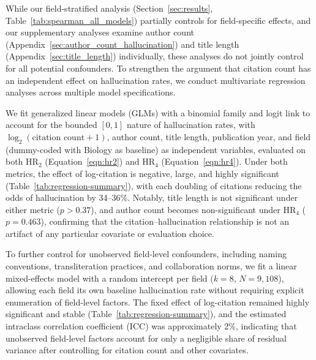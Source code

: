 \documentclass[11pt]{article}
\begin{document}
While our field-stratified analysis (Section~\ref{sec:results}, Table~\ref{tab:spearman_all_models}) partially controls for field-specific effects, and our supplementary analyses examine author count (Appendix~\ref{sec:author_count_hallucination}) and title length (Appendix~\ref{sec:title_length}) individually, these analyses do not jointly control for all potential confounders. To strengthen the argument that citation count has an independent effect on hallucination rates, we conduct multivariate regression analyses across multiple model specifications.

We fit generalized linear models (GLMs) with a binomial family and logit link to account for the bounded $[0,1]$ nature of hallucination rates, with $\log_2(\text{citation count} + 1)$, author count, title length, publication year, and field (dummy-coded with Biology as baseline) as independent variables, evaluated on both HR$_2$ (Equation~\ref{eqn:hr2}) and HR$_4$ (Equation~\ref{eqn:hr4}). Under both metrics, the effect of log-citation is negative, large, and highly significant (Table~\ref{tab:regression-summary}), with each doubling of citations reducing the odds of hallucination by 34--36\%. Notably, title length is not significant under either metric ($p > 0.37$), and author count becomes non-significant under HR$_4$ ($p = 0.463$), confirming that the citation--hallucination relationship is not an artifact of any particular covariate or evaluation choice.

To further control for unobserved field-level confounders, including naming conventions, transliteration practices, and collaboration norms, we fit a linear mixed-effects model with a random intercept per field ($k = 8$, $N = 9{,}108$), allowing each field its own baseline hallucination rate without requiring explicit enumeration of field-level factors. The fixed effect of log-citation remained highly significant and stable (Table~\ref{tab:regression-summary}), and the estimated intraclass correlation coefficient (ICC) was approximately 2\%, indicating that unobserved field-level factors account for only a negligible share of residual variance after controlling for citation count and other covariates.

\begin{table}[htbp]
\centering
\footnotesize
{}
\caption{Citation coefficient across model specifications. $^{\dagger}$Coefficient on probability scale; GLM coefficients are on log-odds scale.}
\label{tab:regression-summary}
\end{table}
\end{document}
